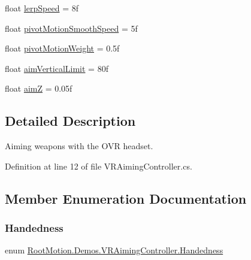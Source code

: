 \begin{DoxyCompactItemize}
\item 
float \mbox{\hyperlink{class_root_motion_1_1_demos_1_1_v_r_aiming_controller_ac4aa733d606e1865b387ed2a5c349460}{lerp\+Speed}} = 8f
\item 
float \mbox{\hyperlink{class_root_motion_1_1_demos_1_1_v_r_aiming_controller_a30de092c32466a249e2e2359221e965f}{pivot\+Motion\+Smooth\+Speed}} = 5f
\item 
float \mbox{\hyperlink{class_root_motion_1_1_demos_1_1_v_r_aiming_controller_a9771dbdf7c4900af38a7c8595643e7b5}{pivot\+Motion\+Weight}} = 0.\+5f
\item 
float \mbox{\hyperlink{class_root_motion_1_1_demos_1_1_v_r_aiming_controller_a55e745e29b9c43b7a5622bac7288a378}{aim\+Vertical\+Limit}} = 80f
\item 
float \mbox{\hyperlink{class_root_motion_1_1_demos_1_1_v_r_aiming_controller_a01bdac614d05950b279caa9ee955dbf8}{aimZ}} = 0.\+05f
\end{DoxyCompactItemize}


\subsection{Detailed Description}
Aiming weapons with the O\+VR headset. 



Definition at line 12 of file V\+R\+Aiming\+Controller.\+cs.



\subsection{Member Enumeration Documentation}
\mbox{\label{class_root_motion_1_1_demos_1_1_v_r_aiming_controller_ab88bf3b4946db8022f1a2049e3fc9399}} 
\subsubsection{\texorpdfstring{Handedness}{Handedness}}
{\footnotesize\ttfamily enum \mbox{\hyperlink{class_root_motion_1_1_demos_1_1_v_r_aiming_controller_ab88bf3b4946db8022f1a2049e3fc9399}{Root\+Motion.\+Demos.\+V\+R\+Aiming\+Controller.\+Handedness}}\hspace{0.3cm}{\ttfamily [strong]}}

